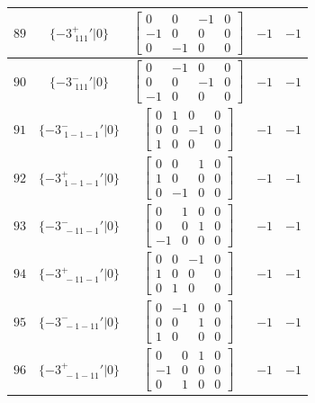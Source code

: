 \documentclass[fleqn,8pt]{jsarticle}
\begin{document}
\begin{longtable}{ccccc}
$ 89 $ & $ \{-3^{+}_{\,\,111}{}'|0\} $ & $ \begin{bmatrix} 0 & 0 & -1 & 0 \\ -1 & 0 & 0 & 0 \\ 0 & -1 & 0 & 0 \end{bmatrix} $ & $ -1 $ & $ -1 $ \\ \hline
$ 90 $ & $ \{-3^{-}_{\,\,111}{}'|0\} $ & $ \begin{bmatrix} 0 & -1 & 0 & 0 \\ 0 & 0 & -1 & 0 \\ -1 & 0 & 0 & 0 \end{bmatrix} $ & $ -1 $ & $ -1 $ \\ \hline
$ 91 $ & $ \{-3^{-}_{\,\,1-1-1}{}'|0\} $ & $ \begin{bmatrix} 0 & 1 & 0 & 0 \\ 0 & 0 & -1 & 0 \\ 1 & 0 & 0 & 0 \end{bmatrix} $ & $ -1 $ & $ -1 $ \\ \hline
$ 92 $ & $ \{-3^{+}_{\,\,1-1-1}{}'|0\} $ & $ \begin{bmatrix} 0 & 0 & 1 & 0 \\ 1 & 0 & 0 & 0 \\ 0 & -1 & 0 & 0 \end{bmatrix} $ & $ -1 $ & $ -1 $ \\ \hline
$ 93 $ & $ \{-3^{-}_{\,\,-11-1}{}'|0\} $ & $ \begin{bmatrix} 0 & 1 & 0 & 0 \\ 0 & 0 & 1 & 0 \\ -1 & 0 & 0 & 0 \end{bmatrix} $ & $ -1 $ & $ -1 $ \\ \hline
$ 94 $ & $ \{-3^{+}_{\,\,-11-1}{}'|0\} $ & $ \begin{bmatrix} 0 & 0 & -1 & 0 \\ 1 & 0 & 0 & 0 \\ 0 & 1 & 0 & 0 \end{bmatrix} $ & $ -1 $ & $ -1 $ \\ \hline
$ 95 $ & $ \{-3^{-}_{\,\,-1-11}{}'|0\} $ & $ \begin{bmatrix} 0 & -1 & 0 & 0 \\ 0 & 0 & 1 & 0 \\ 1 & 0 & 0 & 0 \end{bmatrix} $ & $ -1 $ & $ -1 $ \\ \hline
$ 96 $ & $ \{-3^{+}_{\,\,-1-11}{}'|0\} $ & $ \begin{bmatrix} 0 & 0 & 1 & 0 \\ -1 & 0 & 0 & 0 \\ 0 & 1 & 0 & 0 \end{bmatrix} $ & $ -1 $ & $ -1 $ \\
\end{longtable}
\end{document}
